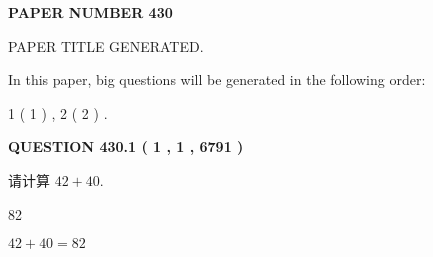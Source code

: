 \documentclass{ctexart}
\begin{document}
   
   
   
\newpage 
\setcounter{page}{ 
   430001 } 
   
   
   
   
 {\textbf{ \Large{ PAPER NUMBER  430  }}}
   
   
\vspace{0.2in}
   
   
   
   
   
   
   
   
 \vspace{0.2in}
 
 
 
 
   
   
 PAPER TITLE GENERATED.
   
   
   
\vspace{0.2in}
   
In this paper, big questions will be generated in the following order: 
   
   
   1 ( 1 )
 ,
   2 ( 2 )
 .
  
\vspace{0.2in}
  
{\textbf{\Large{QUESTION
430.1 
 ( 1 , 1 , 6791 )
}}}
  
  
 
请计算 $ %
42 +  %
40 $.
 
 
 
\noindent{}
 
 

82
 
 
\noindent{}
 
 

 
 
 
\noindent{}
 
 

$ %
42 +  %
40=   %
82$
 
 
\noindent{}
 
 

 
   
   
   
\end{document}
